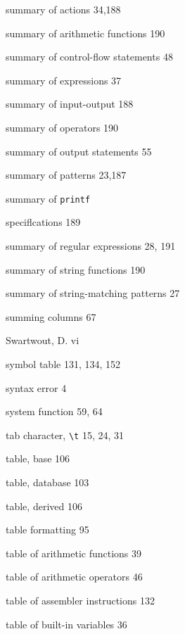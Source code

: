 \begin{multicols}{3}
\hangindent=3pc  summary of actions 34,188

\hangindent=3pc  summary of arithmetic functions 190

\hangindent=3pc  summary of control-flow statements 48

\hangindent=3pc  summary of expressions 37

\hangindent=3pc  summary of input-output 188

\hangindent=3pc  summary of operators 190

\hangindent=3pc  summary of output statements 55

\hangindent=3pc  summary of patterns 23,187

\hangindent=3pc  summary of \verb'printf'

\hangindent=3pc  speciflcations 189

\hangindent=3pc  summary of regular expressions 28, 191

\hangindent=3pc  summary of string functions 190

\hangindent=3pc  summary of string-matching patterns 27

\hangindent=3pc  summing columns 67

\hangindent=3pc  Swartwout, D. vi

\hangindent=3pc  symbol table 131, 134, 152

\hangindent=3pc  syntax error 4

\hangindent=3pc  system function 59, 64

\hangindent=3pc  tab character, \verb'\t' 15, 24, 31

\hangindent=3pc  table, base 106

\hangindent=3pc  table, database 103

\hangindent=3pc  table, derived 106

\hangindent=3pc  table formatting 95

\hangindent=3pc  table of arithmetic functions 39

\hangindent=3pc  table of arithmetic operators 46

\hangindent=3pc  table of assembler instructions 132

\hangindent=3pc  table of built-in variables 36


\end{multicols}
